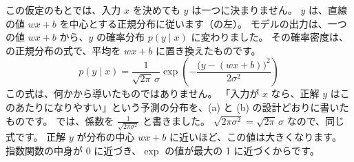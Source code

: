 この仮定のもとでは、入力 $x$ を決めても $y$ は一つに決まりません。
$y$ は、直線の値 $wx+b$ を中心とする正規分布に従います（の左）。
モデルの出力は、一つの値 $wx+b$ から、$y$ の確率分布 $p(y\mid x)$ に変わりました。
その確率密度は、の正規分布の式で、平均を $wx+b$ に置き換えたものです。
\begin{equation}
p(y \mid x) = \frac{1}{\sqrt{2\pi}\,\sigma}\exp\!\left(-\frac{\bigl(y - (wx+b)\bigr)^2}{2\sigma^2}\right)
\label{eq:ml-gauss-density}
\end{equation}
この式は、何かから導いたものではありません。
「入力が $x$ なら、正解 $y$ はこのあたりになりやすい」という予測の分布を、(a) と (b) の設計どおりに書いたものです。
では、係数を $\frac{1}{\sqrt{2\pi\sigma^2}}$ と書きました。
$\sqrt{2\pi\sigma^2}=\sqrt{2\pi}\,\sigma$ なので、同じ式です。
正解 $y$ が分布の中心 $wx+b$ に近いほど、この値は大きくなります。
指数関数の中身が 0 に近づき、$\exp$ の値が最大の 1 に近づくからです。

